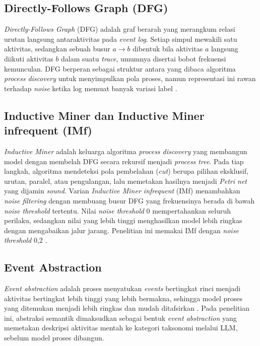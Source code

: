 \subsection{Directly-Follows Graph (DFG)}
\textit{Directly-Follows Graph} (DFG) adalah graf berarah yang merangkum relasi urutan langsung antaraktivitas pada \textit{event log}. Setiap simpul mewakili satu aktivitas, sedangkan sebuah busur $a \rightarrow b$ dibentuk bila aktivitas $a$ langsung diikuti aktivitas $b$ dalam suatu \textit{trace}, umumnya disertai bobot frekuensi kemunculan. DFG berperan sebagai struktur antara yang dibaca algoritma \textit{process discovery} untuk menyimpulkan pola proses, namun representasi ini rawan terhadap \textit{noise} ketika log memuat banyak variasi label \cite{augusto2019automated}.

\subsection{Inductive Miner dan Inductive Miner infrequent (IMf)}
\textit{Inductive Miner} adalah keluarga algoritma \textit{process discovery} yang membangun model dengan membelah DFG secara rekursif menjadi \textit{process tree}. Pada tiap langkah, algoritma mendeteksi pola pembelahan (\textit{cut}) berupa pilihan eksklusif, urutan, paralel, atau pengulangan, lalu memetakan hasilnya menjadi \textit{Petri net} yang dijamin \textit{sound}. Varian \textit{Inductive Miner infrequent} (IMf) menambahkan \textit{noise filtering} dengan membuang busur DFG yang frekuensinya berada di bawah \textit{noise threshold} tertentu. Nilai \textit{noise threshold} 0 mempertahankan seluruh perilaku, sedangkan nilai yang lebih tinggi menghasilkan model lebih ringkas dengan mengabaikan jalur jarang. Penelitian ini memakai IMf dengan \textit{noise threshold} 0,2 \cite{leemans2013discovering, augusto2019automated}.

\subsection{Event Abstraction}
\textit{Event abstraction} adalah proses menyatukan \textit{events} bertingkat rinci menjadi aktivitas bertingkat lebih tinggi yang lebih bermakna, sehingga model proses yang ditemukan menjadi lebih ringkas dan mudah ditafsirkan \cite{tax2016event}. Pada penelitian ini, abstraksi semantik dimaksudkan sebagai bentuk \textit{event abstraction} yang memetakan deskripsi aktivitas mentah ke kategori taksonomi melalui LLM, sebelum model proses dibangun.


